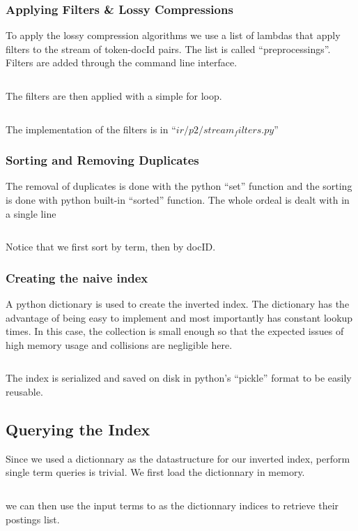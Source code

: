 \documentclass[]{article}
\begin{document}
		\subsubsection{Applying Filters \& Lossy Compressions}
			To apply the lossy compression algorithms we use a list of lambdas that apply filters to the stream of token-docId pairs. The list is called ``preprocessings''. Filters are added through the command line interface.
			\inputminted{python}{codesnippets/filterlist.txt}
			The filters are then applied with a simple for loop.
			\inputminted{python}{codesnippets/filter.txt}
			The implementation of the filters is in ``$ir/p2/stream_filters.py$''

		\subsubsection{Sorting and Removing Duplicates}
			The removal of duplicates is done with the python ``set'' function and the sorting is done with python built-in ``sorted'' function. The whole ordeal is dealt with in a single line
			\inputminted{python}{codesnippets/sort.txt}
			Notice that we first sort by term, then by docID.

		\subsubsection{Creating the naive index}
			A python dictionary is used to create the inverted index. The dictionary has the advantage of being easy to implement and most importantly has constant lookup times. In this case, the collection is small enough so that the expected issues of high memory usage and collisions are negligible here.
			\inputminted[]{python}{codesnippets/naiveindex.txt}
			The index is serialized and saved on disk in python's ``pickle'' format to be easily reusable.
	\subsection{Querying the Index}
		Since we used a dictionnary as the datastructure for our inverted index, perform single term queries is trivial. We first load the dictionnary in memory.
		\inputminted{python}{codesnippets/loadindex.txt}
		we can then use the input terms to as the dictionnary indices to retrieve their postings list.
		\inputminted[]{python}{codesnippets/indexretrieval.txt}

\newpage
\end{document}
